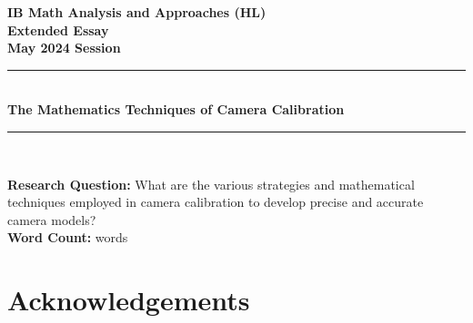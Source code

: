 \documentclass[12pt, oneside]{article}
\begin{document}

\begin{titlepage}
    \large

    \begin{center}

        \vspace*{2cm}

        {\bfseries
            IB Math Analysis and Approaches (HL) \\
            Extended Essay\\
            May 2024 Session}\\

        \vspace*{\fill}

        \rule{\linewidth}{1.5pt} \\ [0.5cm]
        {\LARGE \bfseries The Mathematics Techniques of Camera Calibration}
        \rule{\linewidth}{0.5pt} \\

        \vspace*{\fill}

        \textbf{Research Question:} What are the various strategies and mathematical techniques employed in camera calibration to develop precise and accurate camera models?\\ [1cm]

        \textbf{Word Count:} \wordcount words

        \vspace*{2cm}

    \end{center}

\end{titlepage}

\pagestyle{frontmatter}
\tableofcontents

\clearpage
\pagestyle{mainmatter}









\section*{Acknowledgements}
\end{document}
